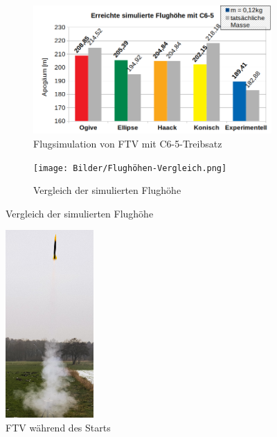\documentclass[11pt,a4paper]{article}
\begin{document}
\begin{figure}[H]
	\begin{subfigure}[l]{0.49\textwidth}
		\centering
		\includegraphics[width=\textwidth]{Bilder/Flugsimulation-C6-5.png}
		\caption{Flugsimulation von FTV mit \textsf{C6-5}-Treibsatz}
		\label{sfig-Flugsimulation}
	\end{subfigure}
	\begin{subfigure}[r]{0.49\textwidth}
		\centering
		\texttt{[image: Bilder/Flughöhen-Vergleich.png]}
		\caption{Vergleich der simulierten Flughöhe}
		\label{sfig-Simulierte-Flughöhe}
	\end{subfigure}
\end{figure}

\vspace{-10pt}
\begin{figure}
	\vspace{-11pt}
	\centering
	\includegraphics[width=0.3\textwidth]{Bilder/Flugversuch-Start.jpg}
	\caption{FTV während des Starts}
\end{figure}
\end{document}
